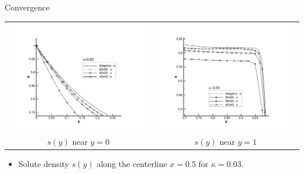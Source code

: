\documentclass[compress,12pt]{beamer}
\begin{document}
\begin{frame}{Convergence}
  \begin{center}
    \begin{tabular}{cc} \\
      \includegraphics[viewport=124 40 670 550,clip=true,width=.5\textwidth]{figures/s_x_equal_0_point_5_zoom_0}&
      \includegraphics[viewport=124 40 670 550,clip=true,width=.5\textwidth]{figures/s_x_equal_0_point_5_zoom_1}\\
      $s(y)$ near $y=0$ &
      $s(y)$ near $y=1$ 
    \end{tabular}
    \begin{itemize}
    \item Solute density $s(y)$ along the centerline $x=0.5$ for $\kappa=0.03$.
    \end{itemize}
  \end{center}    
\end{frame}
\end{document}
